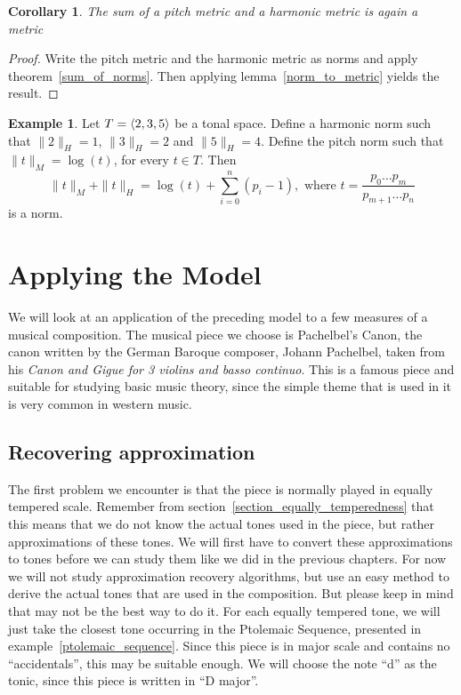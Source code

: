 \documentclass[a4paper]{book}
\newtheorem{corollary}[theorem]{Corollary}
\theoremstyle{definition}
\newtheorem{example}[theorem]{Example}
\begin{document}
\begin{corollary}
    The sum of a pitch metric and a harmonic metric is again a metric
    \label{sum_of_metrics}
\end{corollary}
\begin{proof}
    Write the pitch metric and the harmonic metric as norms and apply theorem~\ref{sum_of_norms}.
    Then applying lemma~\ref{norm_to_metric} yields the result.
\end{proof}

\begin{example}
    Let $T = \langle 2,3,5 \rangle$ be a tonal space.
    Define a harmonic norm such that $\|2\|_H = 1$, $\|3\|_H = 2$ and $\|5\|_H = 4$.
    Define the pitch norm such that $\|t\|_M = \log(t)$, for every $t\in T$.
    Then \[\|t\|_M + \|t\|_H = \log(t) +\sum_{i = 0}^{n}{(p_i-1)},\text{\ where\ } t = \frac{p_0 \dots p_m}{p_{m+1} \dots p_n} \] is a norm.
\end{example}

\chapter{Applying the Model}
\label{application}
We will look at an application of the preceding model to a few measures of a musical composition.
The musical piece we choose is Pachelbel's Canon, the canon written by the German Baroque composer, Johann Pachelbel, taken from his \emph{Canon and Gigue for 3 violins and basso continuo}.
This is a famous piece and suitable for studying basic music theory, since the simple theme that is used in it is very common in western music.

\section{Recovering approximation}
The first problem we encounter is that the piece is normally played in equally tempered scale.
Remember from section~\ref{section_equally_temperedness} that this means that we do not know the actual tones used in the piece, but rather approximations of these tones.
We will first have to convert these approximations to tones before we can study them like we did in the previous chapters.
For now we will not study approximation recovery algorithms, but use an easy method to derive the actual tones that are used in the composition.
But please keep in mind that may not be the best way to do it.
For each equally tempered tone, we will just take the closest tone occurring in the Ptolemaic Sequence, presented in example~\ref{ptolemaic_sequence}.
Since this piece is in major scale and contains no ``accidentals'', this may be suitable enough.
We will choose the note ``d'' as the tonic, since this piece is written in ``D major''.
\end{document}
